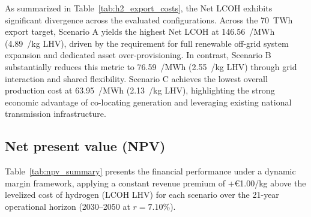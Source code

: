 \documentclass[preprint,12pt]{elsarticle}
\begin{document}
As summarized in Table~\ref{tab:h2_export_costs}, the Net LCOH exhibits significant divergence across the evaluated configurations. Across the 70~TWh export target, Scenario A yields the highest Net LCOH at 146.56~\texteuro/MWh (4.89~\texteuro/kg LHV), driven by the requirement for full renewable off-grid system expansion and dedicated asset over-provisioning. In contrast, Scenario B substantially reduces this metric to 76.59~\texteuro/MWh (2.55~\texteuro/kg LHV) through grid interaction and shared flexibility. Scenario C achieves the lowest overall production cost at 63.95~\texteuro/MWh (2.13~\texteuro/kg LHV), highlighting the strong economic advantage of co-locating generation and leveraging existing national transmission infrastructure.

\subsection{Net present value (NPV)}
Table~\ref{tab:npv_summary} presents the financial performance under a dynamic margin framework, applying a constant revenue premium of +€1.00/kg above the levelized cost of hydrogen (LCOH LHV) for each scenario over the 21-year operational horizon (2030–2050 at $r = 7.10\%$).
\begin{table}[ht]
\centering
\caption{Annual operational cash flows, project return metrics, and multi-year discounted financial evaluation by scenario (2030–2050) under a dynamic cost-plus revenue margin pricing model ($+\text{€}1.00/\text{kg}$ over scenario-specific LCOH at LHV) and an assumed zero $\text{CO}_2$ emission tax, evaluated at a discount rate of $r = 7.10\%$.}
\label{tab:npv_summary}
\small
\setlength{\tabcolsep}{8pt}
\end{table}
\end{document}
